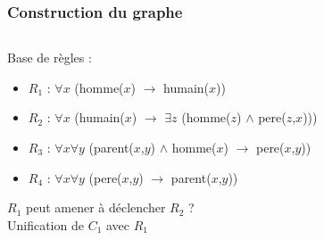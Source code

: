 \begin{frame}
	\frametitle{Construction du graphe}
	\begin{columns}
	\begin{column}{0.55\linewidth}
		Base de règles :
		\begin{itemize}
			\item $R_1$ : $\forall x$ (homme($x$) $\rightarrow$ humain($x$))
			\item $R_2$ : $\forall x$ (humain($x$) $\rightarrow$ $\exists z$ (homme($z$)
			$\wedge$ pere($z$,$x$)))
			\item $R_3$ : $\forall x \forall y$ (parent($x$,$y$) $\wedge$ homme($x$)
			$\rightarrow$ pere($x$,$y$))
			\item $R_4$ : $\forall x \forall y$ (pere($x$,$y$) $\rightarrow$
			parent($x$,$y$))\\
		\end{itemize}
		\vfill
		$R_1$ peut amener à déclencher $R_2$ ?\\
		Unification de $C_1$ avec $R_1$
	\end{column}
	\vline
	\hfill
	\begin{column}{0.35\linewidth}
		\begin{figure}
		\end{figure}
	\end{column}
	\end{columns}
\end{frame}


